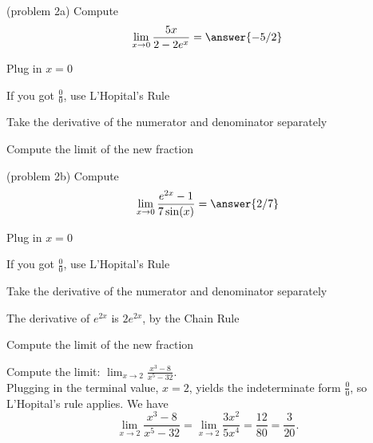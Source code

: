 \documentclass{ximera}
\begin{document}
\begin{problem}(problem 2a)
  Compute
  \[
  \lim_{x \to 0} \frac{5x}{2 - 2e^x} = \answer{-5/2}
  \]
  
    \begin{hint}
      Plug in $x=0$
    \end{hint}
    \begin{hint}
      If you got $\frac00$, use L'Hopital's Rule
    \end{hint}
    \begin{hint}
      Take the derivative of the numerator and denominator separately
    \end{hint}
	  \begin{hint}
      Compute the limit of the new fraction
    \end{hint}
	
\end{problem}


\begin{problem}(problem 2b)
  Compute
  \[
  \lim_{x \to 0} \frac{e^{2x} -1}{7\sin(x)} = \answer{2/7}
  \]
  
    \begin{hint}
      Plug in $x=0$
    \end{hint}
    \begin{hint}
      If you got $\frac00$, use L'Hopital's Rule
    \end{hint}
    \begin{hint}
      Take the derivative of the numerator and denominator separately
    \end{hint}
		\begin{hint}
		 The derivative of $e^{2x}$ is $2e^{2x}$, by the Chain Rule
	  \end{hint}
		\begin{hint}
      Compute the limit of the new fraction
    \end{hint}
    
\end{problem}


\begin{example}[example 3]
Compute the limit: \quad $\displaystyle{\lim_{x \to 2} \frac{x^3 - 8}{x^5 - 32}}.$\\
Plugging in the terminal value, $x=2$, yields 
the indeterminate form $\frac00$, so L'Hopital's rule applies.
We have 
\[\lim_{x \to 2} \frac{x^3 - 8}{x^5 - 32} = \lim_{x \to 2} \frac{3x^2}{5x^4} = \frac{12}{80} = \frac{3}{20}.\]
\end{example}
\end{document}
